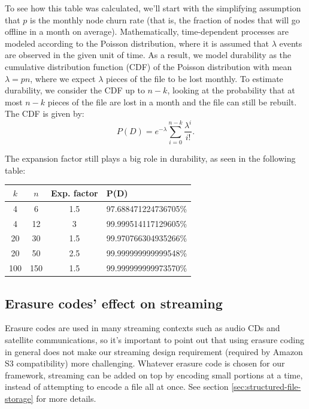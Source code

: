 \documentclass[8pt,fleqn,openany]{book}
\begin{document}
To see how this table was calculated, we'll start
with the simplifying assumption that $p$ is the monthly node
churn rate (that is, the fraction of nodes that will go offline in a month on
average). Mathematically, time-dependent processes are modeled according to
the Poisson distribution, where it is assumed that $\lambda$ events are
observed in the given unit of time.
As a result, we model durability
as the cumulative distribution function (CDF) of the Poisson distribution with mean $\lambda=pn$,
where we expect $\lambda$ pieces of the file to be lost monthly.
To estimate
durability, we consider the CDF up to $n-k$,
looking at the probability that at most $n-k$ pieces
of the file are lost in a month and the file can still be rebuilt.
The CDF is given by:
\begin{equation}
P(D) = e^{-\lambda} \sum_{i=0}^{n-k} \frac{\lambda^i}{i!}.
\label{eq:poiss_cdf}
\end{equation}

The expansion factor still plays a big role in durability, as seen in the
following table:

\begin{center}
\begin{tabular}{c c c l}
$k$ & $n$ & Exp. factor & P(D) \\ \hline
4 & 6 & 1.5 & 97.688471224736705\%\\
4 & 12 & 3 & 99.999514117129605\%\\
20 & 30 & 1.5 & 99.970766304935266\%\\
20 & 50 & 2.5 & 99.999999999999548\%\\
100 & 150 & 1.5 & 99.999999999973570\%\\
\end{tabular}
\end{center}

\subsection{Erasure codes' effect on streaming}

Erasure codes are used in many streaming contexts such as audio CDs and
satellite communications, so it's important to point out that using erasure
coding in general does not make our streaming design requirement
(required by Amazon S3 compatibility) more challenging.
Whatever erasure code is chosen for our framework, streaming can be
added on top by encoding small portions at a time, instead of attempting to
encode a file all at once. See section \ref{sec:structured-file-storage} for
more details.
\end{document}
